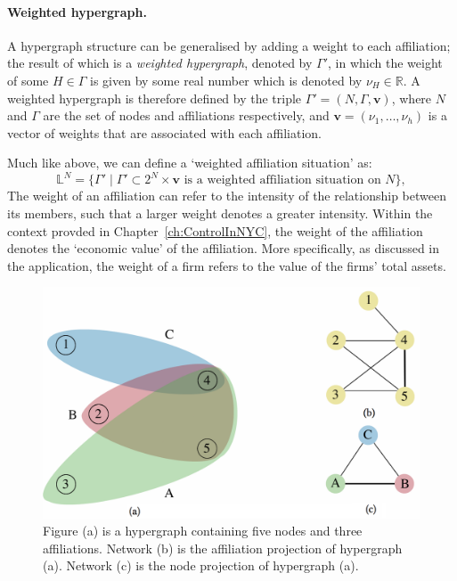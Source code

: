 \paragraph{Weighted hypergraph.}

A hypergraph structure can be generalised by adding a weight to each affiliation; the result of which is a \emph{weighted hypergraph}, denoted by $\Gamma'$, in which the weight of some $H \in \Gamma$ is given by some real number which is denoted by $\nu_{H} \in \mathbb{R}$. A weighted hypergraph is therefore defined by the triple $\Gamma' = (N, \Gamma, \mathbf{v})$, where $N$ and $\Gamma$ are the set of nodes and affiliations respectively, and $\mathbf{v} = (\nu_{1}, \ldots , \nu_{h})$ is a vector of weights that are associated with each affiliation.

Much like above, we can define a `weighted affiliation situation' as:
\begin{equation*}
\mathbb{L}^N = \{ \Gamma' \mid \Gamma' \subset 2^N \times \mathbf{v} \mbox{ is a weighted affiliation situation on } N \} ,
\end{equation*}
The weight of an affiliation can refer to the intensity of the relationship between its members, such that a larger weight denotes a greater intensity. Within the context provded in Chapter~\ref{ch:ControlInNYC}, the weight of the affiliation denotes the `economic value' of the affiliation. More specifically, as discussed in the application, the weight of a firm refers to the value of the firms' total assets.

\begin{figure}[t]
\begin{center}
\includegraphics[scale=0.28]{Images/hypergraph.png}
\end{center}
\caption[Hypergraph and network projections]{Figure (a) is a hypergraph containing five nodes and three affiliations. Network (b) is the affiliation projection of hypergraph (a). Network (c) is the node projection of hypergraph (a).}
\label{hypergraph}
\end{figure}

